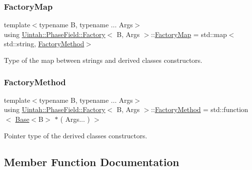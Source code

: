 \subsubsection{\texorpdfstring{Factory\+Map}{FactoryMap}}
{\footnotesize\ttfamily template$<$typename B, typename ... Args$>$ \\
using \hyperlink{classUintah_1_1PhaseField_1_1Factory}{Uintah\+::\+Phase\+Field\+::\+Factory}$<$ B, Args $>$\+::\hyperlink{classUintah_1_1PhaseField_1_1Factory_aedb6067c58282efa01a12ad72414e0ac}{Factory\+Map} =  std\+::map$<$std\+::string, \hyperlink{classUintah_1_1PhaseField_1_1Factory_a896fba2efac0d82ed579b9b0772936f9}{Factory\+Method}$>$\hspace{0.3cm}{\ttfamily [protected]}}



Type of the map between strings and derived classes constructors. 

\mbox{\label{classUintah_1_1PhaseField_1_1Factory_a896fba2efac0d82ed579b9b0772936f9}} 
\subsubsection{\texorpdfstring{Factory\+Method}{FactoryMethod}}
{\footnotesize\ttfamily template$<$typename B, typename ... Args$>$ \\
using \hyperlink{classUintah_1_1PhaseField_1_1Factory}{Uintah\+::\+Phase\+Field\+::\+Factory}$<$ B, Args $>$\+::\hyperlink{classUintah_1_1PhaseField_1_1Factory_a896fba2efac0d82ed579b9b0772936f9}{Factory\+Method} =  std\+::function$<$ \hyperlink{classUintah_1_1PhaseField_1_1Base}{Base}$<$B$>$ $\ast$ ( Args... ) $>$\hspace{0.3cm}{\ttfamily [protected]}}



Pointer type of the derived classes constructors. 



\subsection{Member Function Documentation}
\mbox{\label{classUintah_1_1PhaseField_1_1Factory_a286182b5e21838a37893f80613d4a449}} 
